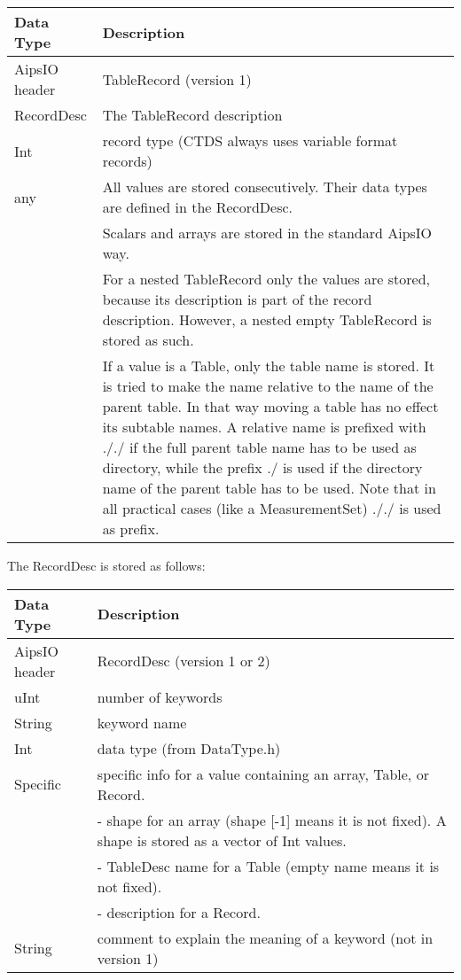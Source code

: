 \vspace{0.15in}
\begin{tabular}{|l|p{13cm}|} \hline
  Data Type & Description \\ \hline\hline
  AipsIO header & TableRecord (version 1) \\
  RecordDesc & The TableRecord description \\
  Int & record type (CTDS always uses variable format records) \\
  any & All values are stored consecutively.
  Their data types are defined in the RecordDesc.
   \tabularnewline & Scalars and arrays are stored in the standard AipsIO way.
   \tabularnewline & For a nested TableRecord only the values are
   stored, because its description is part of the record
   description. However, a nested empty TableRecord is stored as such.
  \tabularnewline & If a value is a Table, only the table name is
  stored. It is tried to make the name relative to the
  name of the parent table. In that way moving a table has no effect
  its subtable names. A relative name is prefixed with
  ././ if the full parent table name has to be used as
  directory, while the prefix ./ is used if the directory name of
  the parent table has to be used. Note that in all practical cases
  (like a MeasurementSet) ././ is used as prefix. \\
  \hline
\end{tabular}
\vspace{0.15in}

The RecordDesc is stored as follows:

\vspace{0.15in}
\begin{tabular}{|l|p{13cm}|} \hline
  Data Type & Description \\ \hline\hline
  AipsIO header & RecordDesc (version 1 or 2) \\
  uInt & number of keywords \\
  String & keyword name \\
  Int & data type (from DataType.h) \\
  Specific & specific info for a value containing an array, Table, or Record.
  \tabularnewline & - shape for an array (shape [-1] means it is not
  fixed). A shape is stored as a vector of Int values.
  \tabularnewline & - TableDesc name for a Table (empty name means it is not fixed).
  \tabularnewline & - description for a Record. \\
  String & comment to explain the meaning of a keyword (not in version 1) \\
  \hline
\end{tabular}
\vspace{0.15in}

